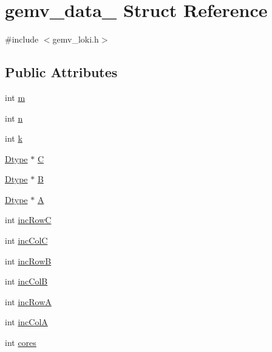 \hypertarget{structgemv__data__}{}\section{gemv\+\_\+data\+\_\+ Struct Reference}
\label{structgemv__data__}


{\ttfamily \#include $<$gemv\+\_\+loki.\+h$>$}

\subsection*{Public Attributes}
\begin{DoxyCompactItemize}
\item 
int \hyperlink{structgemv__data___a774cbf8dfdd303881fc83a7549797fb3}{m}
\item 
int \hyperlink{structgemv__data___a165500db799a309ded6742589becdbd8}{n}
\item 
int \hyperlink{structgemv__data___a5ed131658b3409ede30f2761512a2c4e}{k}
\item 
\hyperlink{setting_8h_a4cf883a2c584175fecfaeb45a2cd75e8}{Dtype} $\ast$ \hyperlink{structgemv__data___a64d56e30c3d5a2ea8feabbe11bd2a70b}{C}
\item 
\hyperlink{setting_8h_a4cf883a2c584175fecfaeb45a2cd75e8}{Dtype} $\ast$ \hyperlink{structgemv__data___a437fa8647c7e283563f8bcb4b4c379b2}{B}
\item 
\hyperlink{setting_8h_a4cf883a2c584175fecfaeb45a2cd75e8}{Dtype} $\ast$ \hyperlink{structgemv__data___a120de2b904677805467232c26b8af153}{A}
\item 
int \hyperlink{structgemv__data___a98dcbbe2b006b1365fbdccc1e99d9765}{inc\+RowC}
\item 
int \hyperlink{structgemv__data___a3df30ac9e178fc230a4b90cbd2cfb598}{inc\+ColC}
\item 
int \hyperlink{structgemv__data___ab467ace2cfe2946398e9e34dfbca63e5}{inc\+RowB}
\item 
int \hyperlink{structgemv__data___a47ad86691e2be7536257e7a2e8ce145b}{inc\+ColB}
\item 
int \hyperlink{structgemv__data___a0780fa92ea679b3cd0bc92cfa685f838}{inc\+RowA}
\item 
int \hyperlink{structgemv__data___a4820f4def0001079a93abb64dd04cfa3}{inc\+ColA}
\item 
int \hyperlink{structgemv__data___ae3041c12adc3a15238af64c157842672}{cores}
\end{DoxyCompactItemize}


